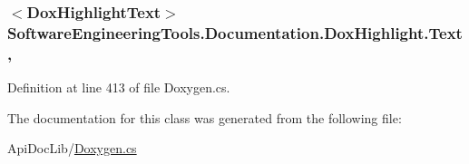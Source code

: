 \hypertarget{class_software_engineering_tools_1_1_documentation_1_1_dox_highlight_abcc420fbf26093bfee830c81b6d1f0d2}{
\subsubsection[{Text}]{$<${\bf Dox\+Highlight\+Text}$>$ Software\+Engineering\+Tools.\+Documentation.\+Dox\+Highlight.\+Text\hspace{0.3cm}{\ttfamily [get]}, {\ttfamily [set]}}}\label{class_software_engineering_tools_1_1_documentation_1_1_dox_highlight_abcc420fbf26093bfee830c81b6d1f0d2}


Definition at line 413 of file Doxygen.\+cs.



The documentation for this class was generated from the following file\+:\begin{DoxyCompactItemize}
\item 
Api\+Doc\+Lib/\hyperlink{_doxygen_8cs}{Doxygen.\+cs}\end{DoxyCompactItemize}
